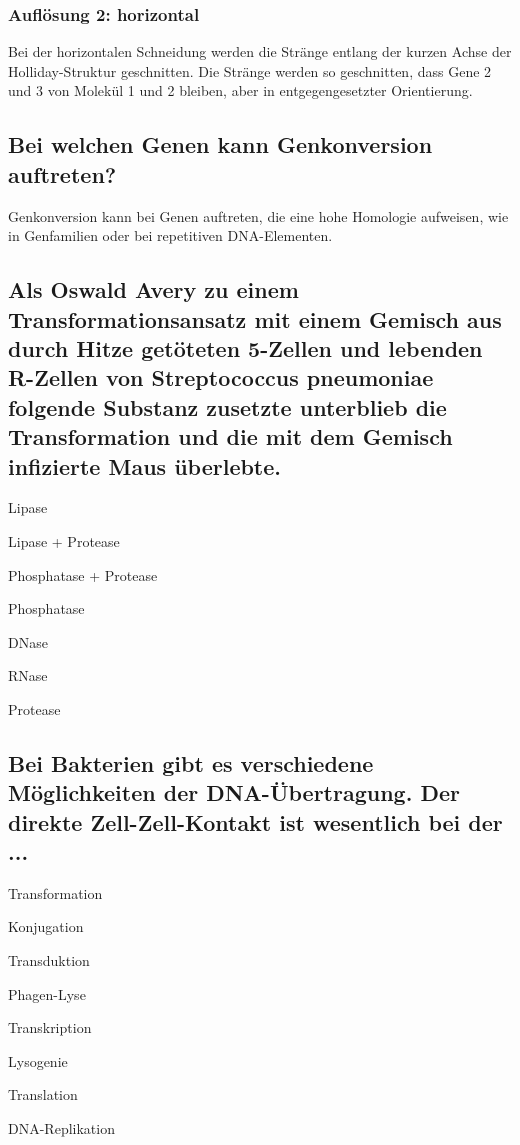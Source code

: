 \documentclass{article}
\newcommand{\cmark}{\ding{51}}%
\newcommand{\done}{\rlap{$\square$}{\raisebox{2pt}{\large\hspace{1pt}\cmark}}%
\hspace{-2.5pt}}
\begin{document}
\subsubsection*{Auflösung 2: horizontal}
Bei der horizontalen Schneidung werden die Stränge entlang der kurzen Achse der Holliday-Struktur geschnitten. \newline
Die Stränge werden so geschnitten, dass Gene 2 und 3 von Molekül 1 und 2 bleiben, aber in entgegengesetzter Orientierung. \newline


\subsection*{Bei welchen Genen kann Genkonversion auftreten?}
Genkonversion kann bei Genen auftreten, die eine hohe Homologie aufweisen, wie in Genfamilien oder bei repetitiven DNA-Elementen.

\subsection*{Als Oswald Avery zu einem Transformationsansatz mit einem Gemisch aus durch Hitze getöteten 5-Zellen und lebenden R-Zellen von Streptococcus pneumoniae folgende Substanz zusetzte unterblieb die Transformation und die mit dem Gemisch infizierte Maus überlebte.
}
\begin{todolist}
\item Lipase
\item Lipase + Protease 
\item Phosphatase + Protease
\item Phosphatase 
\item [\done] DNase
\item RNase
\item Protease
\end{todolist}
\subsection*{Bei Bakterien gibt es verschiedene Möglichkeiten der DNA-Übertragung. Der direkte Zell-Zell-Kontakt ist wesentlich bei der ...}
\begin{todolist}
\item Transformation
\item [\done] Konjugation
\item Transduktion
\item Phagen-Lyse 
\item Transkription
\item Lysogenie
\item Translation
\item DNA-Replikation
\end{todolist}
\end{document}
